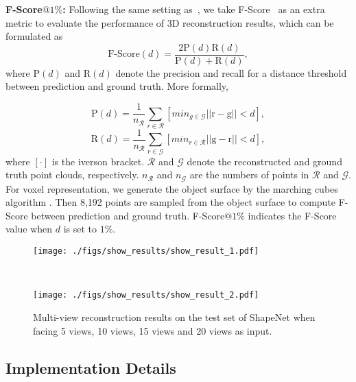 \documentclass[10pt,twocolumn,letterpaper]{article}
\begin{document}
\textbf{F-Score$@1\%$:} Following the same setting as~\cite{xie2020pix2vox++}, we take F-Score~\cite{tatarchenko2019single} as an extra metric to evaluate the performance of 3D reconstruction results, which can be formulated as 
\begin{equation}
	\text{F-Score}(d)=\frac{2\text{P}(d)\text{R}(d)}{\text{P}(d)+\text{R}(d)}, \label{fscore}
\end{equation}
where $\text{P}(d)$ and $\text{R}(d)$ denote the precision and recall for a distance threshold between prediction and ground truth. More formally, 
 
\begin{equation}
    \text{P}(d)=\frac{1}{n_{\mathcal{R}}}\sum_{r\in \mathcal{R}}[{min}_{g\in \mathcal{G}}||\text{r}-\text{g}||<d],
\end{equation}
\begin{equation}
    \text{R}(d)=\frac{1}{n_{\mathcal{R}}}\sum_{r\in \mathcal{G}}[{min}_{r\in \mathcal{R}}||\text{g}-\text{r}||<d],
\end{equation}
where $[\cdot]$ is the iverson bracket. $\mathcal{R}$ and $\mathcal{G}$ denote the reconstructed and ground truth point clouds, respectively. $n_{\mathcal{R}}$ and $n_{\mathcal{G}}$ are the numbers of points in $\mathcal{R}$ and $\mathcal{G}$. For voxel representation, we generate the object surface by the marching cubes algorithm \cite{lorensen1987marching}. Then 8,192 points are sampled from the object surface to compute F-Score between prediction and ground truth. F-Score$@1\%$ indicates the F-Score value when $d$ is set to $1\%$.




\begin{figure*}[t]
    \centering
	\begin{minipage}{1\linewidth}
        \centerline{\texttt{[image: ./figs/show\_results/show\_result\_1.pdf]}}
	\end{minipage}
	\\ \vspace{0.5mm}
	\begin{minipage}{1\linewidth}
        \centerline{\texttt{[image: ./figs/show\_results/show\_result\_2.pdf]}}
	\end{minipage}
	\caption{Multi-view reconstruction results on the test set of ShapeNet when facing 5 views, 10 views, 15 views and 20 views as input.}
\label{show_results}
\end{figure*}

\subsection{Implementation Details}
\end{document}
